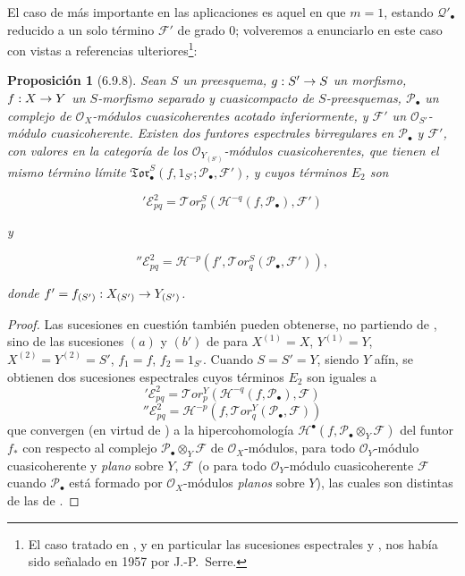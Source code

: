 \documentclass[10pt,oneside,openany]{book}
\theoremstyle{egaenv}\newtheorem*{env}{---}
\theoremstyle{egastatement}
\newtheorem*{proposition}{Proposición}
\theoremstyle{egadescription}
\renewcommand{\to}{\mathchoice{\longrightarrow}{\rightarrow}{\rightarrow}{\rightarrow}}
\begin{document}
El caso de  más importante en las aplicaciones es aquel en
que $m=1$, estando $\mathscr Q'_\bullet$ reducido a un solo término
$\mathscr F'$ de grado $0$; volveremos a enunciarlo en este caso con vistas
a referencias ulteriores\footnote{El caso tratado en , y en
particular las sucesiones espectrales  y
, nos había sido señalado en 1957 por J.-P.~Serre.}:

\begin{proposition}[6.9.8]
\label{III.6.9.8}
Sean $S$ un preesquema, $g:S'\to S$ un morfismo,
$f:X\to Y$ un $S$-morfismo separado y cuasicompacto de $S$-preesquemas,
$\mathscr P_\bullet$ un complejo de $\mathscr O_X$-módulos cuasicoherentes
acotado inferiormente, y $\mathscr F'$ un $\mathscr O_{S'}$-módulo
cuasicoherente. Existen dos funtores espectrales birregulares en
$\mathscr P_\bullet$ y $\mathscr F'$, con valores en la categoría de los
$\mathscr O_{Y_{(S')}}$-módulos cuasicoherentes, que tienen el mismo término
límite $\mathfrak{Tor}_\bullet^S(f,1_{S'};\mathscr P_\bullet,\mathscr F')$, y cuyos términos $E_2$ son

\label{III.6.9.8.1}
\[
  {}'\mathscr E_{pq}^2
  =\mathscr{T}\!or_p^S
  (\mathscr H^{-q}(f,\mathscr P_\bullet),\mathscr F')
  \tag{6.9.8.1}\label{III.6.9.8.1.fr}
\]

y

\label{III.6.9.8.2}
\[
  {}''\mathscr E_{pq}^2
  =\mathscr H^{-p}
  (f',\mathscr{T}\!or_q^S(\mathscr P_\bullet,\mathscr F')),
  \tag{6.9.8.2}\label{III.6.9.8.2.fr}
\]

donde $f'=f_{(S')}:X_{(S')}\to Y_{(S')}$.
\end{proposition}

\begin{proof}
Las sucesiones en cuestión también pueden obtenerse, no partiendo de
, sino de las sucesiones $(a)$ y $(b')$ de
 para $X^{(1)}=X$, $Y^{(1)}=Y$,
$X^{(2)}=Y^{(2)}=S'$, $f_1=f$, $f_2=1_{S'}$. Cuando $S=S'=Y$, siendo $Y$
afín, se obtienen dos sucesiones espectrales cuyos términos $E_2$ son iguales
a
\[
  {}'\mathscr E_{pq}^2
  =\mathscr{T}\!or_p^Y
  (\mathscr H^{-q}(f,\mathscr P_\bullet),\mathscr F)
  \tag{6.9.8.3}\label{III.6.9.8.3.fr}
\]
\[
  {}''\mathscr E_{pq}^2
  =\mathscr H^{-p}
  (f,\mathscr{T}\!or_q^Y(\mathscr P_\bullet,\mathscr F))
  \tag{6.9.8.4}\label{III.6.9.8.4.fr}
\]
que convergen (en virtud de ) a la hipercohomología
$\mathscr H^\bullet(f,\mathscr P_\bullet\otimes_Y\mathscr F)$ del funtor
$f_*$ con respecto al complejo
$\mathscr P_\bullet\otimes_Y\mathscr F$ de $\mathscr O_X$-módulos, para todo
$\mathscr O_Y$-módulo cuasicoherente y \emph{plano} sobre $Y$, $\mathscr F$ (o para
todo $\mathscr O_Y$-módulo cuasicoherente $\mathscr F$ cuando
$\mathscr P_\bullet$ está formado por $\mathscr O_X$-módulos \emph{planos} sobre
$Y$), las cuales son distintas de las de .
\end{proof}
\end{document}

